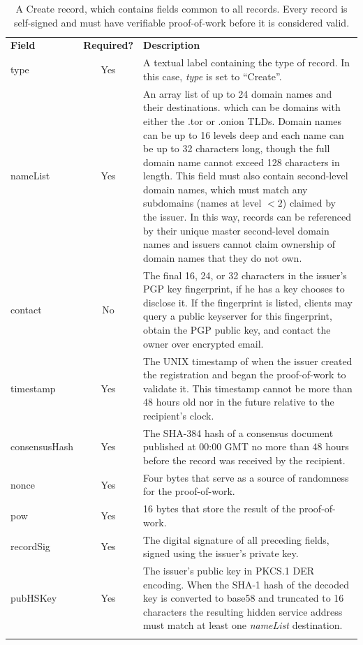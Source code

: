 \renewcommand{\arraystretch}{1.75} %
\begin{center}
    \begin{longtabu}{ | l | c | p{9.5cm} |}
    \hline
    \textbf{Field} & \textbf{Required?} & \textbf{Description} \\
    type & Yes & A textual label containing the type of record. In this case, \emph{type} is set to ``Create''. \\
    nameList & Yes & An array list of up to 24 domain names and their destinations. which can be domains with either the .tor or .onion TLDs. Domain names can be up to 16 levels deep and each name can be up to 32 characters long, though the full domain name cannot exceed 128 characters in length. This field must also contain second-level domain names, which must match any subdomains (names at level $ < 2 $) claimed by the issuer. In this way, records can be referenced by their unique master second-level domain names and issuers cannot claim ownership of domain names that they do not own. \\
    contact & No & The final 16, 24, or 32 characters in the issuer's PGP key fingerprint, if he has a key chooses to disclose it. If the fingerprint is listed, clients may query a public keyserver for this fingerprint, obtain the PGP public key, and contact the owner over encrypted email. \\
	timestamp & Yes & The UNIX timestamp of when the issuer created the registration and began the proof-of-work to validate it. This timestamp cannot be more than 48 hours old nor in the future relative to the recipient's clock. \\
	consensusHash & Yes & The SHA-384 hash of a consensus document published at 00:00 GMT no more than 48 hours before the record was received by the recipient. \\
	nonce & Yes & Four bytes that serve as a source of randomness for the proof-of-work. \\
    pow & Yes & 16 bytes that store the result of the proof-of-work. \\
    recordSig & Yes & The digital signature of all preceding fields, signed using the issuer's private key. \\
    pubHSKey & Yes & The issuer's public key in PKCS.1 DER encoding. When the SHA-1 hash of the decoded key is converted to base58 and truncated to 16 characters the resulting hidden service address must match at least one \emph{nameList} destination.
    \\
    \hline
    \caption{A Create record, which contains fields common to all records. Every record is self-signed and must have verifiable proof-of-work before it is considered valid.}
    \end{longtabu}
	\label{table:createTable}
\end{center}


